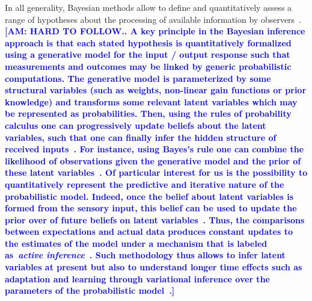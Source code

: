 \documentclass[12pt,english]{article}%
\newcommand{\citep}[1]{\parencite{#1}}
\newcommand{\AM}[1]{\textbf{\textcolor{blue}{[AM: #1]}}}
\begin{document}
In all generality, Bayesian methods allow to define and quantitatively assess
a range of hypotheses about the processing
of available information by observers~\citep{Deneve1999, Diaconescu2014, Daunizeau10a}.
\AM{HARD TO FOLLOW.. A key principle in the Bayesian inference approach is
that each stated hypothesis is quantitatively formalized
using a generative model for the input / output response
such that measurements and outcomes may be linked by
generic probabilistic computations.
The generative model is parameterized by some structural variables
(such as weights, non-linear gain functions or prior knowledge)
and transforms some relevant latent variables
which may be represented as probabilities.
Then, using the rules of probability calculus
one can progressively update beliefs about the latent variables,
such that one can finally infer the hidden structure of received inputs~\citep{Hoyer2003, Ma2014}.
For instance, using Bayes's rule one can combine
the likelihood of observations given the generative model and
the prior of these latent variables~\citep{Janes2014}.
Of particular interest for us is the possibility to
quantitatively represent
the predictive and iterative nature of the probabilistic model.
Indeed, once the belief about latent variables
is formed from the sensory input,
this belief can be used to update
the prior over of future beliefs on latent variables~\citep{Montagnini2007}.
Thus, the comparisons between expectations and actual data produces
constant updates to the estimates of the model under a mechanism
that is labeled as~\textit{active inference}~\citep{Friston2003, Friston2010}.
Such methodology thus allows to infer latent variables at present
but also to understand longer time effects such as adaptation and learning
through variational inference over
the parameters of the probabilistic model~\citep{ref}.}
\end{document}
